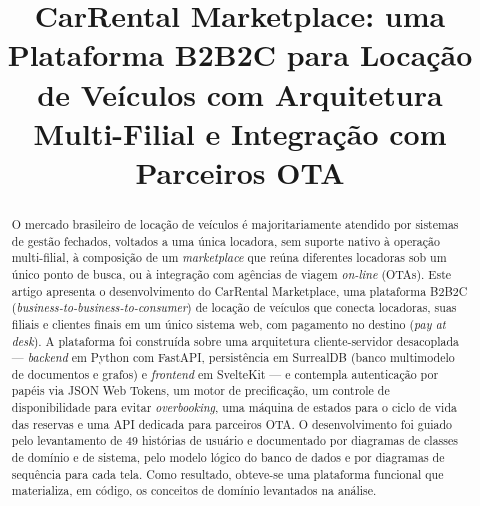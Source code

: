 \documentclass[conference,a4paper]{IEEEtran}
\begin{document}
\restoregeometry
\setcounter{page}{4}

\title{CarRental Marketplace: uma Plataforma B2B2C para Locação de Veículos com Arquitetura Multi-Filial e Integração com Parceiros OTA}

\author{
}

\maketitle

\begin{abstract}
O mercado brasileiro de locação de veículos é majoritariamente atendido por sistemas de gestão fechados, voltados a uma única locadora, sem suporte nativo à operação multi-filial, à composição de um \textit{marketplace} que reúna diferentes locadoras sob um único ponto de busca, ou à integração com agências de viagem \textit{on-line} (OTAs). Este artigo apresenta o desenvolvimento do CarRental Marketplace, uma plataforma B2B2C (\textit{business-to-business-to-consumer}) de locação de veículos que conecta locadoras, suas filiais e clientes finais em um único sistema web, com pagamento no destino (\textit{pay at desk}). A plataforma foi construída sobre uma arquitetura cliente-servidor desacoplada --- \textit{backend} em Python com FastAPI, persistência em SurrealDB (banco multimodelo de documentos e grafos) e \textit{frontend} em SvelteKit --- e contempla autenticação por papéis via JSON Web Tokens, um motor de precificação, um controle de disponibilidade para evitar \textit{overbooking}, uma máquina de estados para o ciclo de vida das reservas e uma API dedicada para parceiros OTA. O desenvolvimento foi guiado pelo levantamento de 49 histórias de usuário e documentado por diagramas de classes de domínio e de sistema, pelo modelo lógico do banco de dados e por diagramas de sequência para cada tela. Como resultado, obteve-se uma plataforma funcional que materializa, em código, os conceitos de domínio levantados na análise.
\end{abstract}
\end{document}
